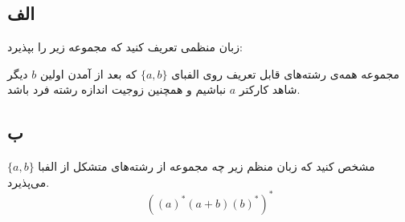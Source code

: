 \subsection*{الف}
زبان منظمی تعریف کنید که مجموعه زیر را بپذیرد:

مجموعه همه‌ی رشته‌های قابل تعریف روی الفبای
$\{a,b\}$
که بعد از آمدن اولین
$b$
دیگر شاهد کارکتر
$a$
نباشیم و همچنین زوجیت اندازه رشته فرد باشد.

\subsection*{ب}
مشخص کنید که زبان منظم زیر چه مجموعه از رشته‌های متشکل از الفبا
$\{a,b\}$
می‌پذیرد.
\[((a)^{*}(a + b)(b)^{*})^{*}\]